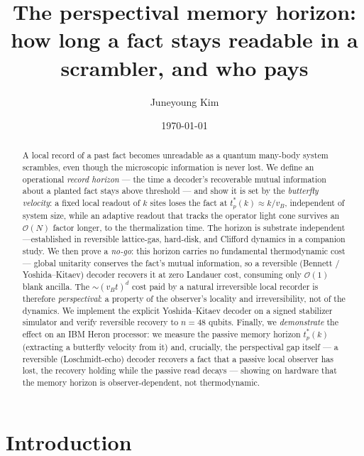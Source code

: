 \documentclass[aps,prxquantum,twocolumn,superscriptaddress,longbibliography]{revtex4-2}
\newcommand{\vB}{v_{B}}
\begin{document}
\title{The perspectival memory horizon:\\
how long a fact stays readable in a scrambler, and who pays}

\author{Juneyoung Kim}

\date{\today}

\begin{abstract}
A local record of a past fact becomes unreadable as a quantum many-body system scrambles, even
though the microscopic information is never lost. We define an operational \emph{record horizon}
--- the time a decoder's recoverable mutual information about a planted fact stays above threshold
--- and show it is set by the \emph{butterfly velocity}: a fixed local readout of $k$ sites loses
the fact at $t^{*}_{p}(k)\approx k/\vB$, independent of system size, while an adaptive readout that
tracks the operator light cone survives an $\mathcal{O}(N)$ factor longer, to the thermalization
time. The horizon is substrate independent---established in reversible lattice-gas, hard-disk, and
Clifford dynamics in a companion study. We then prove a \emph{no-go}: this horizon carries
no fundamental thermodynamic cost --- global unitarity conserves the fact's mutual information, so
a reversible (Bennett / Yoshida--Kitaev) decoder recovers it at zero Landauer cost, consuming only
$\mathcal{O}(1)$ blank ancilla. The $\sim(\vB t)^{d}$ cost paid by a natural irreversible local
recorder is therefore \emph{perspectival}: a property of the observer's locality and
irreversibility, not of the dynamics. We implement the explicit Yoshida--Kitaev decoder on a
signed stabilizer simulator and verify reversible recovery to $n=48$ qubits. Finally, we
\emph{demonstrate} the effect on an IBM Heron processor: we measure the passive memory horizon
$t^{*}_{p}(k)$ (extracting a butterfly velocity from it) and, crucially, the perspectival gap
itself --- a reversible (Loschmidt-echo) decoder recovers a fact that a passive local observer has
lost, the recovery holding while the passive read decays --- showing on hardware that the memory
horizon is observer-dependent, not thermodynamic.
\end{abstract}

\maketitle

\section{Introduction}
\end{document}
